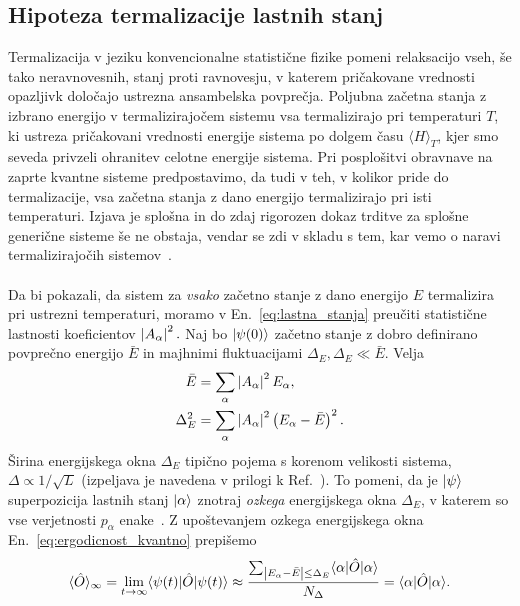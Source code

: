 \subsection{Hipoteza termalizacije lastnih stanj}
Termalizacija v jeziku konvencionalne statistične fizike pomeni relaksacijo vseh, še tako neravnovesnih, stanj proti ravnovesju, v katerem pričakovane vrednosti opazljivk določajo ustrezna ansambelska povprečja. Poljubna začetna stanja z izbrano energijo v termalizirajočem sistemu vsa termalizirajo pri temperaturi $T$, ki ustreza pričakovani vrednosti energije sistema po dolgem času $\langle H\rangle_T$, kjer smo seveda privzeli ohranitev celotne energije sistema. Pri posplošitvi obravnave na zaprte kvantne sisteme predpostavimo, da tudi v teh, v kolikor pride do termalizacije, vsa začetna stanja z dano energijo termalizirajo pri isti temperaturi. Izjava je splošna in do zdaj rigorozen dokaz trditve za splošne generične sisteme še ne obstaja, vendar se zdi v skladu s tem, kar vemo o naravi termalizirajočih sistemov~\cite{nandkishore2015many}.\\\\
Da bi pokazali, da sistem za \emph{vsako} začetno stanje z dano energijo $E$ termalizira pri ustrezni temperaturi, moramo v En.~\eqref{eq:lastna_stanja} preučiti statistične lastnosti koeficientov $\left| A_\alpha \right|^2.$ Naj bo  $\vert\psi(0)\rangle$ začetno stanje z dobro definirano povprečno energijo $\bar{E}$ in majhnimi fluktuacijami $\Delta_E, \Delta_E\ll\bar{E}.$ Velja~\cite{srednicki1999approach}
\begin{equation}
\begin{split}
\bar{E}&=\sum\limits_\alpha \left| A_\alpha \right|^2E_\alpha, \\
\Delta_E^2&=\sum\limits_\alpha \left| A_\alpha \right|^2\left(E_\alpha - \bar{E}\right)^2.
\end{split}
\end{equation}
Širina energijskega okna $\Delta_E$ tipično pojema s korenom velikosti sistema, $\Delta \propto 1/\sqrt{L}$ (izpeljava je navedena v prilogi k Ref.~\cite{rigol2008thermalization}). To pomeni, da je $\vert\psi\rangle$ superpozicija lastnih stanj $\vert\alpha\rangle$ znotraj \emph{ozkega} energijskega okna $\Delta_E$, v katerem so vse verjetnosti $p_\alpha$ enake~\cite{rigol2008thermalization}. Z upoštevanjem ozkega energijskega okna En.~\eqref{eq:ergodicnost_kvantno} prepišemo 
\begin{equation}\label{eq:ETH}
\langle \hat{O}\rangle_\infty=\lim_{t\to\infty}\langle \psi(t) \vert\hat{O}\vert\psi(t)\rangle\approx\frac{\sum_{\left| E_\alpha - \bar{E} \right|\leq \Delta_E}\langle \alpha \vert\hat{O}\vert\alpha\rangle}{N_\Delta}=\langle \alpha \vert\hat{O}\vert\alpha\rangle.
\end{equation}
